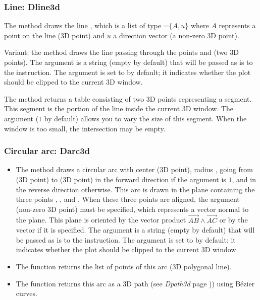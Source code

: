     
\subsubsection{Line: Dline3d}

The method  draws the line , which is a list of type =$\{A,u\}$ where $A$ represents a point on the line (3D point) and $u$ a direction vector (a non-zero 3D point).

Variant: the method  draws the line passing through the points  and  (two 3D points). The  argument is a string (empty by default) that will be passed as is to the \drawcmd instruction. The  argument is set to \false by default; it indicates whether the plot should be clipped to the current 3D window.

The  method returns a table consisting of two 3D points representing a segment. This segment is the portion of the line  inside the current 3D window. The  argument ($1$ by default) allows you to vary the size of this segment. When the window is too small, the intersection may be empty.

\subsubsection{Circular arc: Darc3d}

\begin{itemize}
    \item The method  draws a circular arc with center  (3D point), radius , going from  (3D point) to  (3D point) in the forward direction if the argument  is $1$, and in the reverse direction otherwise. This arc is drawn in the plane containing the three points , , and . When these three points are aligned, the argument  (non-zero 3D point) must be specified, which represents a vector normal to the plane. This plane is oriented by the vector product $\vec{AB}\wedge\vec{AC}$ or by the vector  if it is specified. The  argument is a string (empty by default) that will be passed as is to the \drawcmd instruction. The  argument is set to \false by default; it indicates whether the plot should be clipped to the current 3D window.

    \item The  function returns the list of points of this arc (3D polygonal line).

    \item The  function returns this arc as a 3D path (see \emph{Dpath3d} page \pageref{Dpath3d})) using Bézier curves. 
\end{itemize}

